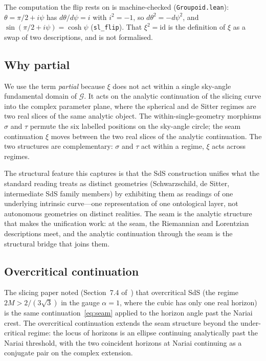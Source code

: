 \documentclass[11pt,a4paper]{article}
\theoremstyle{definition}
\begin{document}
The computation the flip rests on is machine-checked (\texttt{Groupoid.lean}): $\theta=\pi/2+i\psi$ has $d\theta/d\psi=i$ with $i^{2}=-1$, so $d\theta^{2}=-d\psi^{2}$, and $\sin(\pi/2+i\psi)=\cosh\psi$ (\texttt{sl\_flip}). That $\xi^{2}=\text{id}$ is the definition of $\xi$ as a swap of two descriptions, and is not formalised.

\subsection{Why partial}\label{sec:why-partial}

We use the term \emph{partial} because $\xi$ does not act within a single sky-angle fundamental domain of $\mathcal{G}$. It acts on the analytic continuation of the slicing curve into the complex parameter plane, where the spherical and de Sitter regimes are two real slices of the same analytic object. The within-single-geometry morphisms $\sigma$ and $\tau$ permute the six labelled positions on the sky-angle circle; the seam continuation $\xi$ moves between the two real slices of the analytic continuation. The two structures are complementary: $\sigma$ and $\tau$ act within a regime, $\xi$ acts across regimes.

The structural feature this captures is that the SdS construction unifies what the standard reading treats as distinct geometries (Schwarzschild, de Sitter, intermediate SdS family members) by exhibiting them as readings of one underlying intrinsic curve---one representation of one ontological layer, not autonomous geometries on distinct realities. The seam is the analytic structure that makes the unification work: at the seam, the Riemannian and Lorentzian descriptions meet, and the analytic continuation through the seam is the structural bridge that joins them.

\subsection{Overcritical continuation}\label{sec:overcritical}

The slicing paper noted (Section~7.4 of~\cite{JanzenSlicing}) that overcritical SdS (the regime $2M>2/(3\sqrt{3})$ in the gauge $\alpha=1$, where the cubic has only one real horizon) is the same continuation~\eqref{eq:seam} applied to the horizon angle past the Nariai crest. The overcritical continuation extends the seam structure beyond the under-critical regime: the locus of horizons is an ellipse continuing analytically past the Nariai threshold, with the two coincident horizons at Nariai continuing as a conjugate pair on the complex extension.
\end{document}
